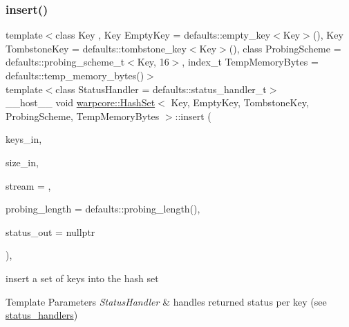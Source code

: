 \subsubsection{\texorpdfstring{insert()}{insert()}\hspace{0.1cm}{\footnotesize\ttfamily [2/2]}}
{\footnotesize\ttfamily template$<$class Key , Key Empty\+Key = defaults\+::empty\+\_\+key$<$\+Key$>$(), Key Tombstone\+Key = defaults\+::tombstone\+\_\+key$<$\+Key$>$(), class Probing\+Scheme  = defaults\+::probing\+\_\+scheme\+\_\+t$<$\+Key, 16$>$, index\+\_\+t Temp\+Memory\+Bytes = defaults\+::temp\+\_\+memory\+\_\+bytes()$>$ \\
template$<$class Status\+Handler  = defaults\+::status\+\_\+handler\+\_\+t$>$ \\
\+\_\+\+\_\+host\+\_\+\+\_\+ void \hyperlink{classwarpcore_1_1HashSet}{warpcore\+::\+Hash\+Set}$<$ Key, Empty\+Key, Tombstone\+Key, Probing\+Scheme, Temp\+Memory\+Bytes $>$\+::insert (\begin{DoxyParamCaption}\item[{key\+\_\+type $\ast$}]{keys\+\_\+in,  }\item[{index\+\_\+type}]{size\+\_\+in,  }\item[{cuda\+Stream\+\_\+t}]{stream = {},  }\item[{index\+\_\+type}]{probing\+\_\+length = {\ttfamily defaults\+:\+:probing\+\_\+length()},  }\item[{typename Status\+Handler\+::base\+\_\+type $\ast$}]{status\+\_\+out = {\ttfamily nullptr} }\end{DoxyParamCaption})\hspace{0.3cm}{\ttfamily [inline]}, {\ttfamily [noexcept]}}



insert a set of keys into the hash set 


\begin{DoxyTemplParams}{Template Parameters}
{\em Status\+Handler} & handles returned status per key (see {\ttfamily \hyperlink{namespacewarpcore_1_1status__handlers}{status\+\_\+handlers}}) \\
\hline
\end{DoxyTemplParams}

